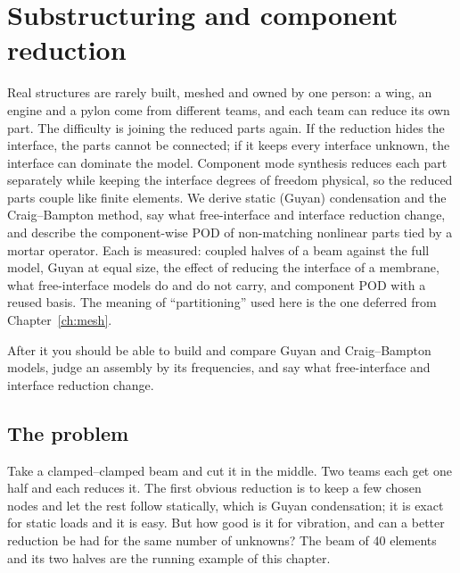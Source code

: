 \chapter{Substructuring and component reduction}\label{ch:cms}

\begin{tcolorbox}[colback=hpale,colframe=hnavy!60,coltitle=white,colbacktitle=hnavy!85,title={In this chapter}]
Real structures are rarely built, meshed and owned by one person: a wing, an engine and a pylon come from different teams, and each team can reduce its own part. The difficulty is joining the reduced parts again. If the reduction hides the interface, the parts cannot be connected; if it keeps every interface unknown, the interface can dominate the model. Component mode synthesis reduces each part separately while keeping the interface degrees of freedom physical, so the reduced parts couple like finite elements. We derive static (Guyan) condensation and the Craig--Bampton method, say what free-interface and interface reduction change, and describe the component-wise POD of non-matching nonlinear parts tied by a mortar operator. Each is measured: coupled halves of a beam against the full model, Guyan at equal size, the effect of reducing the interface of a membrane, what free-interface models do and do not carry, and component POD with a reused basis. The meaning of ``partitioning'' used here is the one deferred from Chapter~\ref{ch:mesh}.\par\smallskip
After it you should be able to build and compare Guyan and Craig--Bampton models, judge an assembly by its frequencies, and say what free-interface and interface reduction change.
\end{tcolorbox}

\section{The problem}\label{sec:cm-problem}

Take a clamped--clamped beam and cut it in the middle. Two teams each get one half and each reduces it. The first obvious reduction is to keep a few chosen nodes and let the rest follow statically, which is Guyan condensation; it is exact for static loads and it is easy. But how good is it for vibration, and can a better reduction be had for the same number of unknowns? The beam of 40 elements and its two halves are the running example of this chapter.

